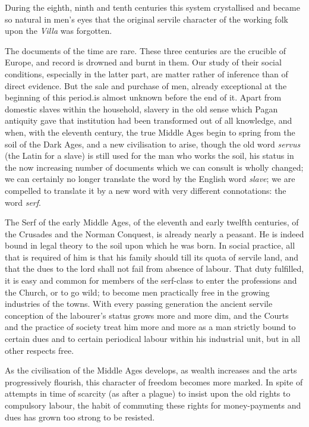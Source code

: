 \documentclass{book}
\begin{document}
During the eighth, ninth and tenth centuries this system crystallised and became so natural in men’s eyes that the original servile character of the working folk upon the \emph{Villa} was forgotten.

The documents of the time are rare. These three centuries are the crucible of Europe, and record is drowned and burnt in them. Our study of their social conditions, especially in the latter part, are matter rather of inference than of direct evidence. But the sale and purchase of men, already exceptional at the beginning of this period.is almost unknown before the end of it. Apart from domestic slaves within the household, slavery in the old sense which Pagan antiquity gave that institution had been transformed out of all knowledge, and when, with the eleventh century, the true Middle Ages begin to spring from the soil of the Dark Ages, and a new civilisation to arise, though the old word \emph{servus} (the Latin for a slave) is still used for the man who works the soil, his status in the now increasing number of documents which we can consult is wholly changed; we can certainly no longer translate the word by the English word \emph{slave}; we are compelled to translate it by a new word with very different connotations: the word \emph{serf}.

The Serf of the early Middle Ages, of the eleventh and early twelfth centuries, of the Crusades and the Norman Conquest, is already nearly a peasant. He is indeed bound in legal theory to the soil upon which he was born. In social practice, all that is required of him is that his family should till its quota of servile land, and that the dues to the lord shall not fail from absence of labour. That duty fulfilled, it is easy and common for members of the serf-class to enter the professions and the Church, or to go wild; to become men practically free in the growing industries of the towns. With every passing generation the ancient servile conception of the labourer’s status grows more and more dim, and the Courts and the practice of society treat him more and more as a man strictly bound to certain dues and to certain periodical labour within his industrial unit, but in all other respects free.

As the civilisation of the Middle Ages develops, as wealth increases and the arts progressively flourish, this character of freedom becomes more marked. In spite of attempts in time of scarcity (as after a plague) to insist upon the old rights to compulsory labour, the habit of commuting these rights for money-payments and dues has grown too strong to be resisted.
\end{document}
